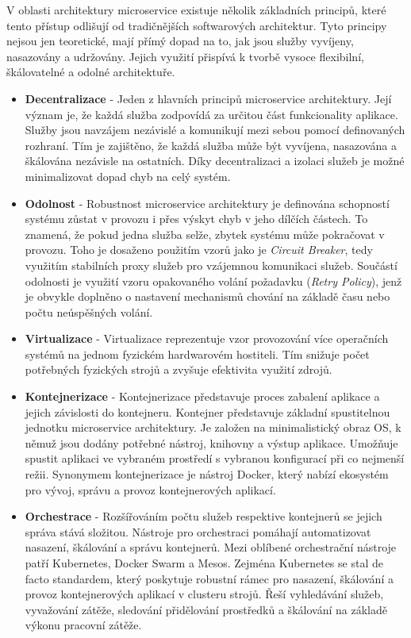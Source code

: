
V oblasti architektury microservice existuje několik základních principů, které tento přístup odlišují od tradičnějších softwarových architektur. Tyto principy nejsou jen teoretické, mají přímý dopad na to, jak jsou služby vyvíjeny, nasazovány a udržovány. Jejich využití přispívá k tvorbě vysoce flexibilní, škálovatelné a odolné architektuře. \cite{Martin2018} \cite{Richardson2018}

\begin{itemize}
    \item \textbf{Decentralizace} - Jeden z hlavních principů microservice architektury. Její význam je, že každá služba zodpovídá za určitou část funkcionality aplikace. Služby jsou navzájem nezávislé a komunikují mezi sebou pomocí definovaných rozhraní. Tím je zajištěno, že každá služba může být vyvíjena, nasazována a škálována nezávisle na ostatních. Díky decentralizaci a izolaci služeb je možné minimalizovat dopad chyb na celý systém.
    \item \textbf{Odolnost} - Robustnost microservice architektury je definována schopností systému zůstat v provozu i přes výskyt chyb v jeho dílčích částech. To znamená, že pokud jedna služba selže, zbytek systému může pokračovat v provozu. Toho je dosaženo použitím vzorů jako je \emph{Circuit Breaker}, tedy využitím stabilních proxy služeb pro vzájemnou komunikaci služeb. Součástí odolnosti je využití vzoru opakovaného volání požadavku (\emph{Retry Policy}), jenž je obvykle doplněno o nastavení mechanismů chování na základě času nebo počtu neúspěšných volání. 
    \item \textbf{Virtualizace} - Virtualizace reprezentuje vzor provozování více operačních systémů na jednom fyzickém hardwarovém hostiteli. Tím snižuje počet potřebných fyzických strojů a zvyšuje efektivita využití zdrojů.
    \item \textbf{Kontejnerizace} - Kontejnerizace představuje proces zabalení aplikace a jejich závislosti do kontejneru. Kontejner představuje základní spustitelnou jednotku microservice architektury. Je založen na minimalistický obraz OS, k němuž jsou dodány potřebné nástroj, knihovny a výstup aplikace. Umožňuje spustit aplikaci ve vybraném prostředí s vybranou konfigurací při co nejmenší režii. Synonymem kontejnerizace je nástroj Docker, který nabízí ekosystém pro vývoj, správu a provoz kontejnerových aplikací.
    \item \textbf{Orchestrace} - Rozšířováním počtu služeb respektive kontejnerů se jejich správa stává složitou. Nástroje pro orchestraci pomáhají automatizovat nasazení, škálování a správu kontejnerů. Mezi oblíbené orchestrační nástroje patří Kubernetes, Docker Swarm a Mesos. Zejména Kubernetes se stal de facto standardem, který poskytuje robustní rámec pro nasazení, škálování a provoz kontejnerových aplikací v clusteru strojů. Řeší vyhledávání služeb, vyvažování zátěže, sledování přidělování prostředků a škálování na základě výkonu pracovní zátěže.

\end{itemize}
